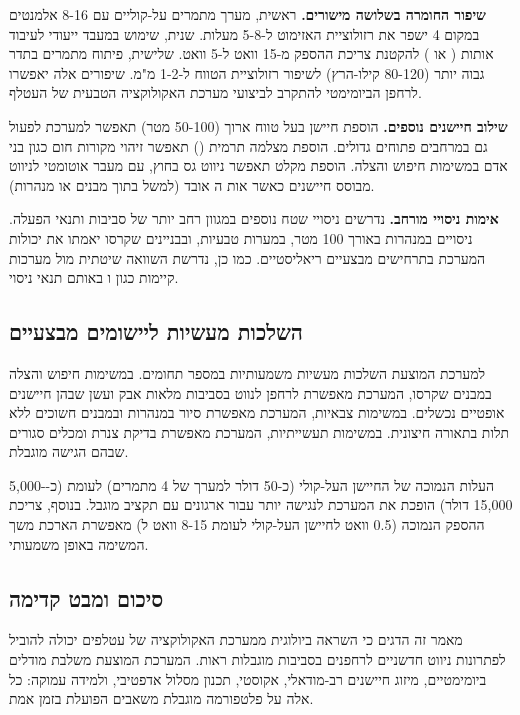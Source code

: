 \textbf{שיפור החומרה בשלושה מישורים.} ראשית, מערך מתמרים על-קוליים עם 8-16 אלמנטים במקום 4 ישפר את רזולוציית האזימוט ל-5-8 מעלות. שנית, שימוש במעבד ייעודי לעיבוד אותות ( או ) להקטנת צריכת ההספק מ-15 וואט ל-5 וואט. שלישית, פיתוח מתמרים בתדר גבוה יותר (80-120 קילו-הרץ) לשיפור רזולוציית הטווח ל-1-2 מ"מ. שיפורים אלה יאפשרו לרחפן הביומימטי להתקרב לביצועי מערכת האקולוקציה הטבעית של העטלף. \cite{CrewAIDocs}

\textbf{שילוב חיישנים נוספים.} הוספת חיישן  בעל טווח ארוך (50-100 מטר) תאפשר למערכת לפעול גם במרחבים פתוחים גדולים. הוספת מצלמה תרמית () תאפשר זיהוי מקורות חום כגון בני אדם במשימות חיפוש והצלה. הוספת מקלט  תאפשר ניווט גס בחוץ, עם מעבר אוטומטי לניווט מבוסס חיישנים כאשר אות ה אובד (למשל בתוך מבנים או מנהרות).

\textbf{אימות ניסויי מורחב.} נדרשים ניסויי שטח נוספים במגוון רחב יותר של סביבות ותנאי הפעלה. ניסויים במנהרות באורך 100 מטר, במערות טבעיות, ובבניינים שקרסו יאמתו את יכולות המערכת בתרחישים מבצעיים ריאליסטיים. כמו כן, נדרשת השוואה שיטתית מול מערכות קיימות כגון  ו באותם תנאי ניסוי. \cite{CrewAIDocs}

\subsection{השלכות מעשיות ליישומים מבצעיים}
\label{sec:ch09_practical_implications}

למערכת המוצעת השלכות מעשיות משמעותיות במספר תחומים. במשימות חיפוש והצלה במבנים שקרסו, המערכת מאפשרת לרחפן לנווט בסביבות מלאות אבק ועשן שבהן חיישנים אופטיים נכשלים. במשימות צבאיות, המערכת מאפשרת סיור במנהרות ובמבנים חשוכים ללא תלות בתאורה חיצונית. במשימות תעשייתיות, המערכת מאפשרת בדיקת צנרת ומכלים סגורים שבהם הגישה מוגבלת. \cite{CrewAIDocs}

העלות הנמוכה של החיישן העל-קולי (כ-50 דולר למערך של 4 מתמרים) לעומת  (כ-5,000-15,000 דולר) הופכת את המערכת לנגישה יותר עבור ארגונים עם תקציב מוגבל. בנוסף, צריכת ההספק הנמוכה (0.5 וואט לחיישן העל-קולי לעומת 8-15 וואט ל) מאפשרת הארכת משך המשימה באופן משמעותי. \cite{CrewAIDocs}

\subsection{סיכום ומבט קדימה}
\label{sec:ch09_outlook}

מאמר זה הדגים כי השראה ביולוגית ממערכת האקולוקציה של עטלפים יכולה להוביל לפתרונות ניווט חדשניים לרחפנים בסביבות מוגבלות ראות. המערכת המוצעת משלבת מודלים ביומימטיים, מיזוג חיישנים רב-מודאלי,  אקוסטי, תכנון מסלול אדפטיבי, ולמידה עמוקה: כל אלה על פלטפורמה מוגבלת משאבים הפועלת בזמן אמת.

